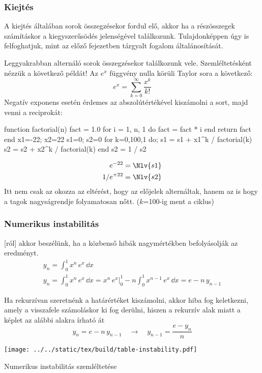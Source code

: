 \documentclass[../../main.tex]{subfiles}
\begin{document}
\subsubsection{Kiejtés}

A kiejtés általában sorok összegzésekor fordul elő, akkor ha a részösszegek
számításkor a kiegyszerűsödés jelenségével találkozunk. Tulajdonképpen úgy is
felfoghatjuk, mint az előző fejezetben tárgyalt fogalom általánosítását.

Leggyakrabban alternáló sorok összegzésekor találkozunk vele. Szemléltetésként
nézzük a következő példát! Az $e^x$ függvény nulla körüli Taylor sora a
következő:
\[
  e^x = \sum_{k=0}^\infty \frac{x^k}{k!}
\]
Negatív exponens esetén érdemes az abszolútértékével kiszámolni a sort, majd
venni a reciprokát:
\begin{luacode*}
  function factorial(n)
  fact = 1.0
  for i = 1, n, 1
  do
  fact = fact * i
  end
  return fact
  end
  x1=-22; x2=22
  s1=0; s2=0
  for k=0,100,1
  do;
  s1 = s1 + x1^k / factorial(k)
  s2 = s2 + x2^k / factorial(k)
  end
  s2 = 1 / s2
\end{luacode*}
\begin{align*}
  e^{-22}     & = \Nlv{s1} \\
  1 / e^{+22} & = \Nlv{s2}
\end{align*}
Itt nem csak az okozza az eltérést, hogy az előjelek alternáltak, hanem az is
hogy a tagok nagyságrendje folyamatosan nőtt. ($k$=100-ig ment a  ciklus)

\subsubsection{Numerikus instabilitás}

[ról] akkor beszélünk, ha a közbenső hibák nagymértékben
befolyásolják az eredményt.
\begin{gather*}
  y_n = \int_0^1 x^n \, e^x \, \dd x
  \\
  y_n
  = \int_0^1 x^n \, e^x \, \dd x
  = \left. x^n \, e^x \right|_0^1 - n \int_0^1 x^{n-1} \, e^x \, \dd x
  = e - n \, y_{n-1}
\end{gather*}

Ha rekurzívan szeretnénk a határértéket kiszámolni, akkor hiba fog keletkezni,
amely a visszafele számoláskor ki fog derülni, hiszen a rekurzív alak miatt
a képlet az alábbi alakra írható át
\[
  y_n = e - n \, y_{n-1}
  \quad \rightarrow \quad
  y_{n-1} = \frac{e - y_n}{n}
\]
\begin{table}[htb]
  \centering
  \texttt{[image: ../../static/tex/build/table-instability.pdf]}
  \caption{Numerikus instabilitás szemléltetése}
  \label{table:instability}
\end{table}
\end{document}
